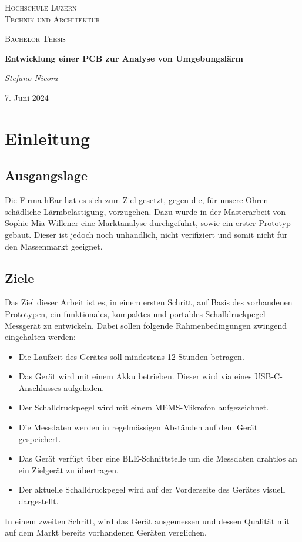 \documentclass[12pt]{article}
\begin{document}
	\begin{titlepage}
		\centering
		\vspace{1cm}
		{\scshape\LARGE Hochschule Luzern \\ Technik und Architektur \par}
		\vspace{1cm}
		{\scshape\Large Bachelor Thesis\par}
		\vspace{1.5cm}
		{\huge\bfseries Entwicklung einer PCB zur Analyse von Umgebungslärm\par}
		\vspace{2cm}
		{\Large\itshape Stefano Nicora\par}
		
		\vfill
		
		{\large 7. Juni 2024\par}
	\end{titlepage}
	\tableofcontents
	
	
	\newpage
	\section{Einleitung}
	\subsection{Ausgangslage} \label{Ausgangslage}
	Die Firma hEar hat es sich zum Ziel gesetzt, gegen die, für unsere Ohren schädliche Lärmbelästigung, vorzugehen. Dazu wurde in der Masterarbeit von Sophie Mia Willener eine Marktanalyse durchgeführt, sowie ein erster Prototyp gebaut. Dieser ist jedoch noch unhandlich, nicht verifiziert und somit nicht für den Massenmarkt geeignet. 
	\subsection{Ziele} \label{Ziele}
	Das Ziel dieser Arbeit ist es, in einem ersten Schritt, auf Basis des vorhandenen Prototypen, ein funktionales, kompaktes und portables Schalldruckpegel-Messgerät zu entwickeln. Dabei sollen folgende Rahmenbedingungen zwingend eingehalten werden:
	\begin{itemize}
		\item Die Laufzeit des Gerätes soll mindestens 12 Stunden betragen.
		\item Das Gerät wird mit einem Akku betrieben. Dieser wird via eines USB-C-Anschlusses aufgeladen.
		\item Der Schalldruckpegel wird mit einem MEMS-Mikrofon aufgezeichnet.
		\item Die Messdaten werden in regelmässigen Abständen auf dem Gerät gespeichert.
		\item Das Gerät verfügt über eine BLE-Schnittstelle um die Messdaten drahtlos an ein Zielgerät zu übertragen.
		\item Der aktuelle Schalldruckpegel wird auf der Vorderseite des Gerätes visuell dargestellt.
	\end{itemize}
	In einem zweiten Schritt, wird das Gerät ausgemessen und dessen Qualität mit auf dem Markt bereits vorhandenen Geräten verglichen.
\end{document}
